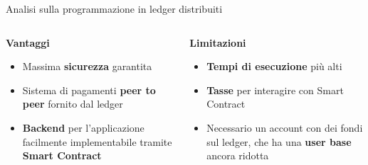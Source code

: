 \documentclass[xcolor=dvipsnames]{beamer}
\begin{document}
\begin{frame}{Analisi sulla programmazione in ledger distribuiti}
    \linespread{1.5}
    \begin{columns}
        \begin{column}{0.5\textwidth}
            \centering
            \color{teal}
            \textbf{\Large Vantaggi}
            {\begin{itemize}
                \item Massima \textbf{sicurezza} garantita
                \item Sistema di pagamenti \textbf{peer to peer} fornito dal ledger
                \item \textbf{Backend} per l'applicazione facilmente implementabile tramite \textbf{Smart Contract}
            \end{itemize}}
        \end{column}
        \begin{column}{0.5\textwidth}
            \centering
            \color{red}
            \textbf{\Large Limitazioni}
            {\begin{itemize}
                \item \textbf{Tempi di esecuzione} più alti
                \item \textbf{Tasse} per interagire con Smart Contract 
                \item Necessario un account con dei fondi sul ledger, che ha una \textbf{user base} ancora ridotta
            \end{itemize}}
        \end{column}
    \end{columns}
\end{frame}
\end{document}
